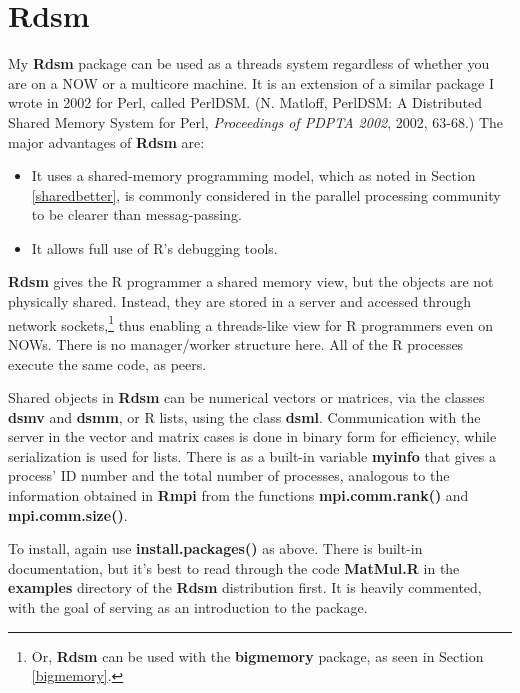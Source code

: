\section{Rdsm}

My {\bf Rdsm} package can be used as a threads system regardless of
whether you are on a NOW or a multicore machine.  It is an extension of
a similar package I wrote in 2002 for Perl, called PerlDSM.  (N.
Matloff, PerlDSM: A Distributed Shared Memory System for Perl, {\it
Proceedings of PDPTA 2002}, 2002, 63-68.)  The major advantages of {\bf
Rdsm} are:

\begin{itemize}

\item It uses a shared-memory programming model, which as noted in
Section \ref{sharedbetter}, is commonly considered in the parallel
processing community to be clearer than messag-passing. 

\item It allows full use of R's debugging tools.

\end{itemize}

{\bf Rdsm} gives the R programmer a shared memory view, but the objects
are not physically shared.  Instead, they are stored in a server and
accessed through network sockets,\footnote{Or, {\bf Rdsm} can be used
with the {\bf bigmemory} package, as seen in Section \ref{bigmemory}.}
thus enabling a threads-like view for R programmers even on NOWs.  There
is no manager/worker structure here.  All of the R processes execute the
same code, as peers.

Shared objects in {\bf Rdsm} can be numerical vectors or matrices, via
the classes {\bf dsmv} and {\bf dsmm}, or R lists, using the class {\bf
dsml}.  Communication with the server in the vector and matrix cases is
done in binary form for efficiency, while serialization is used for
lists.  There is as a built-in variable {\bf myinfo} that gives a
process' ID number and the total number of processes, analogous to the
information obtained in {\bf Rmpi} from the functions {\bf
mpi.comm.rank()} and {\bf mpi.comm.size()}. 

To install, again use {\bf install.packages()} as above.  There is
built-in documentation, but it's best to read through the code {\bf
MatMul.R} in the {\bf examples} directory of the {\bf Rdsm} distribution
first.  It is heavily commented, with the goal of serving as an
introduction to the package.

